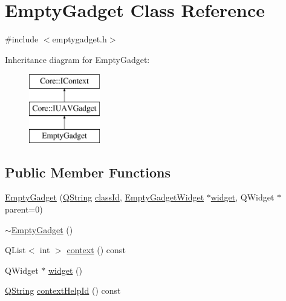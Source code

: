 \hypertarget{class_empty_gadget}{\section{\-Empty\-Gadget \-Class \-Reference}
\label{class_empty_gadget}
}


{\ttfamily \#include $<$emptygadget.\-h$>$}

\-Inheritance diagram for \-Empty\-Gadget\-:\begin{figure}[H]
\begin{center}
\leavevmode
\includegraphics[height=3.000000cm]{class_empty_gadget}
\end{center}
\end{figure}
\subsection*{\-Public \-Member \-Functions}
\begin{DoxyCompactItemize}
\item 
\hyperlink{group___empty_gadget_plugin_ga8dd994979515e846487d11c9ee923175}{\-Empty\-Gadget} (\hyperlink{group___u_a_v_objects_plugin_gab9d252f49c333c94a72f97ce3105a32d}{\-Q\-String} \hyperlink{group___core_plugin_ga3878fde66a57220608960bcc3fbeef2c}{class\-Id}, \hyperlink{class_empty_gadget_widget}{\-Empty\-Gadget\-Widget} $\ast$\hyperlink{group___empty_gadget_plugin_gaf90ce4fcadfb337055b06effe0fa08cb}{widget}, \-Q\-Widget $\ast$parent=0)
\item 
\hyperlink{group___empty_gadget_plugin_ga4c9294b56cd062b22669146def8c2cde}{$\sim$\-Empty\-Gadget} ()
\item 
\-Q\-List$<$ int $>$ \hyperlink{group___empty_gadget_plugin_ga640557d465e9e57a080f459f9ba33c53}{context} () const 
\item 
\-Q\-Widget $\ast$ \hyperlink{group___empty_gadget_plugin_gaf90ce4fcadfb337055b06effe0fa08cb}{widget} ()
\item 
\hyperlink{group___u_a_v_objects_plugin_gab9d252f49c333c94a72f97ce3105a32d}{\-Q\-String} \hyperlink{group___empty_gadget_plugin_ga9ce48ac1c22eba730811d0885ecc9606}{context\-Help\-Id} () const 
\end{DoxyCompactItemize}


